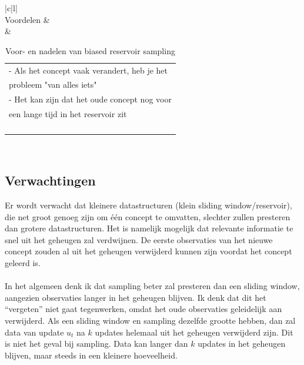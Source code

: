 \begin{table}[!ht]
\begin{tabular}{|c|l|}
\hline
{} \\ \hline
Voordelen &  \\ \hline
{} & \begin{tabular}[c]{@{}l@{}}- Als het concept vaak verandert, heb je het\\ \phantom{-} probleem "van alles iets"\\ - Het kan zijn dat het oude concept nog voor\\ \phantom{-} een lange tijd in het reservoir zit\\ \phantom{test} \\ \phantom{test}\\ \phantom{test}\\ \phantom{test}\end{tabular} \\ \hline
\end{tabular}
\caption{Voor- en nadelen van biased reservoir sampling}
\label{tab:voor- en nadelen van biased reservoir sampling}
\end{table}
\newpage
\subsection{Verwachtingen}
Er wordt verwacht dat kleinere datastructuren (klein sliding window/reservoir), die net groot genoeg zijn om één concept te omvatten, slechter zullen presteren dan grotere datastructuren. Het is namelijk mogelijk dat relevante informatie te snel uit het geheugen zal verdwijnen. De eerste observaties van het nieuwe concept zouden al uit het geheugen verwijderd kunnen zijn voordat het concept geleerd is.
\\\\
In het algemeen denk ik dat sampling beter zal presteren dan een sliding window, aangezien observaties langer in het geheugen blijven. Ik denk dat dit het “vergeten” niet gaat tegenwerken, omdat het oude observaties geleidelijk aan verwijderd. Als een sliding window en sampling dezelfde grootte hebben, dan zal data van update $u_t$ na $k$ updates helemaal uit het geheugen verwijderd zijn. Dit is niet het geval bij sampling. Data kan langer dan $k$ updates in het geheugen blijven, maar steeds in een kleinere hoeveelheid.
